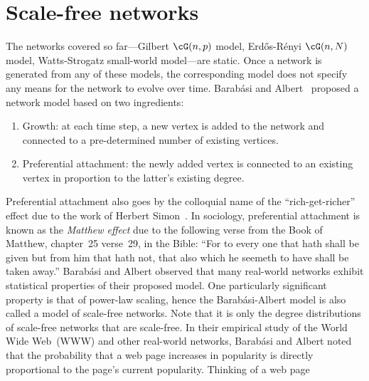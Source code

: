 
\section{Scale-free networks}


The networks covered so far---Gilbert $\cG(n,p)$ model,
Erd\H{o}s-R\'enyi $\cG(n,N)$ model, Watts-Strogatz small-world
model---are static. Once a network is generated from any of these
models, the corresponding model does not specify any means for the
network to evolve over time. Barab\'asi and
Albert~\cite{BarabasiAlbert1999} proposed a network model based on two
ingredients:
\begin{enumerate}
\item Growth: at each time step, a new vertex is added to the network
  and connected to a pre-determined number of existing vertices.

\item Preferential attachment: the
  newly added vertex is connected to an existing vertex in proportion
  to the latter's existing degree.
\end{enumerate}
Preferential attachment also goes by
the colloquial name of the
``rich-get-richer'' effect due to the
work of Herbert Simon~\cite{Simon1955}. In
sociology, preferential attachment is known as the
\emph{Matthew effect} due to the following verse
from the Book of Matthew, chapter~25 verse~29, in the Bible: ``For to
every one that hath shall be given but from him that hath not, that
also which he seemeth to have shall be taken away.'' Barab\'asi and
Albert observed that many real-world networks exhibit statistical
properties of their proposed model. One particularly significant
property is that of power-law scaling, hence the
Barab\'asi-Albert model is also called
a model of scale-free networks. Note that it is only the degree
distributions of scale-free networks that are scale-free. In their
empirical study of the World Wide Web~(WWW) and
other real-world networks, Barab\'asi and Albert noted that the
probability that a web page increases in popularity is directly
proportional to the page's current popularity. Thinking of a web page
